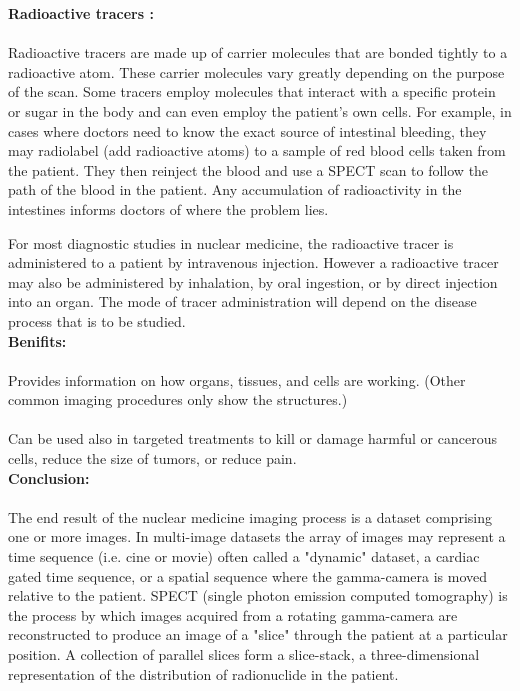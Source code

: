 \documentclass[12pt]{article}
\begin{document}
\noindent \textbf{\large Radioactive tracers :}\\ \\ Radioactive tracers are made up of carrier molecules that are bonded tightly to a radioactive atom. These carrier molecules vary greatly depending on the purpose of the scan. Some tracers employ molecules that interact with a specific protein or sugar in the body and can even employ the patient’s own cells. For example, in cases where doctors need to know the exact source of intestinal bleeding, they may radiolabel (add radioactive atoms) to a sample of red blood cells taken from the patient. They then reinject the blood and use a SPECT scan to follow the path of the blood in the patient. Any accumulation of radioactivity in the intestines informs doctors of where the problem lies.

For most diagnostic studies in nuclear medicine, the radioactive tracer is administered to a patient by intravenous injection. However a radioactive tracer may also be administered by inhalation, by oral ingestion, or by direct injection into an organ. The mode of tracer administration will depend on the disease process that is to be studied.\\

\noindent \textbf{\large Benifits:}\\ \\ Provides information on how organs, tissues, and cells are working. (Other common imaging procedures only show the structures.) \\
\\ Can be used also in targeted treatments to kill or damage harmful or cancerous cells, reduce the size of tumors, or reduce pain.\\

\noindent \textbf{\large Conclusion:} \\ \\ The end result of the nuclear medicine imaging process is a dataset comprising one or more images. In multi-image datasets the array of images may represent a time sequence (i.e. cine or movie) often called a "dynamic" dataset, a cardiac gated time sequence, or a spatial sequence where the gamma-camera is moved relative to the patient. SPECT (single photon emission computed tomography) is the process by which images acquired from a rotating gamma-camera are reconstructed to produce an image of a "slice" through the patient at a particular position. A collection of parallel slices form a slice-stack, a three-dimensional representation of the distribution of radionuclide in the patient.\\ \\ 
\end{document}
